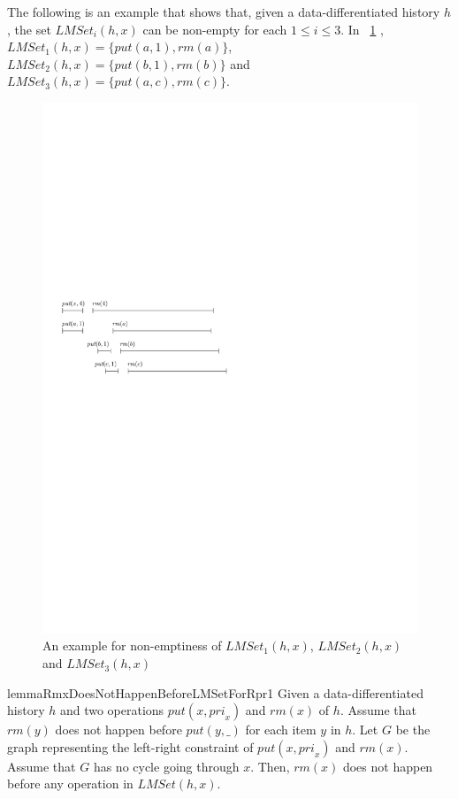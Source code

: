 The following is an example that shows that, given a data-differentiated history $h$, the set $\textit{LMSet}_i(h,x)$ can be non-empty for each $1 \leq i \leq 3$. In \figurename~\ref{fig:his nobound of LMSet} , $\textit{LMSet}_1(h,x) = \{ \textit{put}(a,1),\textit{rm}(a) \}$, $\textit{LMSet}_2(h,x) = \{ \textit{put}(b,1),\textit{rm}(b) \}$ and $\textit{LMSet}_3(h,x) = \{ \textit{put}(a,c),\textit{rm}(c) \}$.

\begin{figure}[htbp]
  \centering
  \includegraphics[width=0.5 \textwidth]{PIC_HIS_NOBOUNDOF_LMSET.pdf}
  \caption{An example for non-emptiness of $\textit{LMSet}_1(h,x)$, $\textit{LMSet}_2(h,x)$ and $\textit{LMSet}_3(h,x)$}
  \label{fig:his nobound of LMSet}
\end{figure}


\begin{restatable}{lemma}{RmxDoesNotHappenBeforeLMSetForRpr1}
\label{lemma:Rmx does not happen before LMSet for Rpr1}
Given a data-differentiated history $h$ and two operations $\textit{put}(x,\textit{pri}_x)$ and $\textit{rm}(x)$ of $h$. %
Assume that $\textit{rm}(y)$ does not happen before $\textit{put}(y,\_)$ for each item $y$ in $h$. Let $G$ be the graph representing the left-right constraint of $\textit{put}(x,\textit{pri}_x)$ and $\textit{rm}(x)$. Assume that $G$ has no cycle going through $x$. Then, $\textit{rm}(x)$ does not happen before any operation in $\textit{LMSet}(h,x)$.
\end{restatable}

